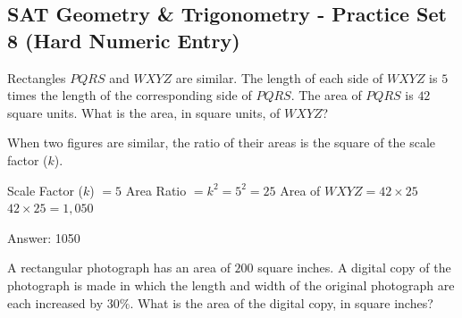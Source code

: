 \documentclass[11pt,paper=a4,answers]{exam}
\begin{document}
\begin{questions}
\pointsinrightmargin
\pointsdroppedatright
\marksnotpoints
{}
\pointformat{\boldmath\themarginpoints}
\bracketedpoints


\section*{SAT Geometry \& Trigonometry - Practice Set 8 (Hard Numeric Entry)}

\question
Rectangles $PQRS$ and $WXYZ$ are similar. The length of each side of $WXYZ$ is $5$ times the length of the corresponding side of $PQRS$. The area of $PQRS$ is $42$ square units. What is the area, in square units, of $WXYZ$?
\begin{center}
\end{center}

\begin{solution}
When two figures are similar, the ratio of their areas is the square of the scale factor ($k$).
\vspace{5pt}
\begin{center}
Scale Factor ($k$) $= 5$
\vspace{5pt}
Area Ratio $= k^2 = 5^2 = 25$
\vspace{5pt}
Area of $WXYZ = 42 \times 25$
\vspace{5pt}
$42 \times 25 = 1,050$
\end{center}
\vspace{5pt}
Answer: \colorbox{yellow!100}{1050}
\end{solution}

\vspace{1cm}

\question
A rectangular photograph has an area of $200$ square inches. A digital copy of the photograph is made in which the length and width of the original photograph are each increased by $30\%$. What is the area of the digital copy, in square inches?
\begin{center}
\end{center}
\end{questions}
\end{document}
